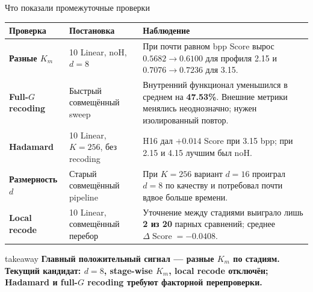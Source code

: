\documentclass[aspectratio=169,10pt]{beamer}
\newcommand{\keypoint}[1]{%
  \begin{beamercolorbox}[
    sep=1.8mm,
    wd=\linewidth
  ]{takeaway}
    \small\bfseries #1
  \end{beamercolorbox}%
}
\newcommand{\score}{\operatorname{Score}}
\begin{document}
\begin{frame}[t]{Что показали промежуточные проверки}
  \footnotesize
  \renewcommand{\arraystretch}{1.12}

  \begin{tabularx}{\textwidth}{@{}p{2.45cm}p{2.75cm}Y@{}}
    \toprule

    \textbf{Проверка}
      & \textbf{Постановка}
      & \textbf{Наблюдение} \\

    \midrule

    \textbf{Разные $K_m$}
      & 10 Linear, noH, $d=8$
      & При почти равном bpp Score вырос
        $0.5682\!\to\!0.6100$ для профиля 2.15
        и $0.7076\!\to\!0.7236$ для 3.15. \\

    \addlinespace[1.1mm]

    \textbf{Full-$G$ recoding}
      & Быстрый совмещённый sweep
      & Внутренний функционал уменьшился в среднем
        на \textbf{47.53\%}.
        Внешние метрики менялись неоднозначно;
        нужен изолированный повтор. \\

    \addlinespace[1.1mm]

    \textbf{Hadamard}
      & 10 Linear, $K=256$, без recoding
      & H16 дал $+0.014$ Score при 3.15 bpp;
        при 2.15 и 4.15 лучшим был noH. \\

    \addlinespace[1.1mm]

    \textbf{Размерность $d$}
      & Старый совмещённый pipeline
      & При $K=256$ вариант $d=16$ проиграл $d=8$
        по качеству и потребовал почти вдвое
        больше времени. \\

    \addlinespace[1.1mm]

    \textbf{Local recode}
      & 10 Linear, совмещённый перебор
      & Уточнение между стадиями выиграло
        лишь \textbf{2 из 20} парных сравнений;
        среднее $\Delta\score=-0.0408$. \\

    \bottomrule
  \end{tabularx}

  \vfill

  \keypoint{
    Главный положительный сигнал --- разные $K_m$ по стадиям.
    Текущий кандидат: $d=8$, stage-wise $K_m$, local recode отключён;
    Hadamard и full-$G$ recoding требуют факторной перепроверки.
  }
\end{frame}
\end{document}
